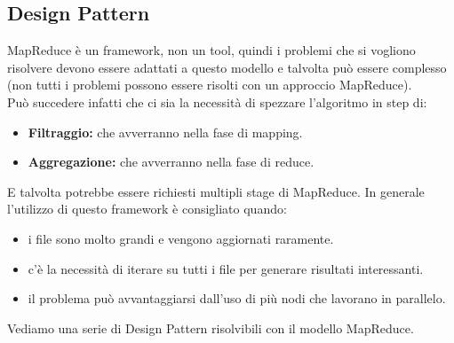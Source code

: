 \documentclass{article}
\begin{document}
\begin{appendices}
\section{Design Pattern}
MapReduce è un framework, non un tool, quindi i problemi che si vogliono risolvere devono essere adattati a questo modello e talvolta può essere complesso (non tutti i problemi possono essere risolti con un approccio MapReduce).\\
Può succedere infatti che ci sia la necessità di spezzare l'algoritmo in step di:
\begin{itemize}
    \item \textbf{Filtraggio:} che avverranno nella fase di mapping.
    \item \textbf{Aggregazione:} che avverranno nella fase di reduce.  
\end{itemize}
E talvolta potrebbe essere richiesti multipli stage di MapReduce.
In generale l'utilizzo di questo framework è consigliato quando:
\begin{itemize}
    \item i file sono molto grandi e vengono aggiornati raramente.
    \item c'è la necessità di iterare su tutti i file per generare risultati interessanti.  
    \item il problema può avvantaggiarsi dall'uso di più nodi che lavorano in parallelo.
\end{itemize}
Vediamo una serie di Design Pattern risolvibili con il modello MapReduce.

\end{appendices}
\end{document}
